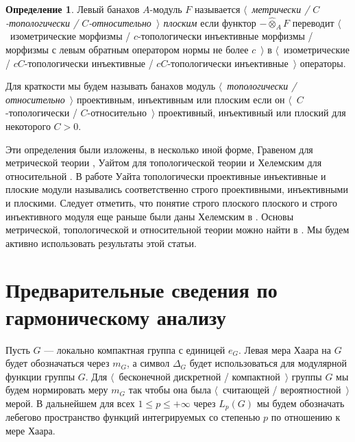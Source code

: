 \documentclass{article}
\numberwithin{equation}{section}
\theoremstyle{plain}
\theoremstyle{definition}
\newtheorem{definition}{Определение}
\newcommand{\projtens}{\mathbin{\widehat{\otimes}}}
\begin{document}
\begin{fulltext}
\begin{definition} Левый банахов $A$-модуль $F$ называется \emph{$\langle$~метрически / 
$C$-топологически / $C$-относительно~$\rangle$ плоским} если функтор $-\projtens_A F$ 
переводит $\langle$~изометрические морфизмы / $c$-топологически инъективные морфизмы / 
морфизмы с левым обратным оператором нормы не более $c$~$\rangle$ в 
$\langle$~изометрические / $cC$-топологически инъективные / $cC$-топологически 
инъективные~$\rangle$ операторы.
\end{definition}

Для краткости мы будем называть банахов модуль \emph{$\langle$~топологически / 
относительно~$\rangle$} проективным, инъективным или плоским если он 
$\langle$~$C$-топологически / $C$-относительно~$\rangle$ проективный, инъективный 
или плоский для некоторого $C>0$.

Эти определения были изложены, в несколько иной форме, Гравеном для метрической 
теории \cite{GravInjProjBanMod},  Уайтом для топологической теории 
\cite{WhiteInjmoduAlg} и Хелемским для относительной \cite{HelemHomolDimNorModBanAlg}. 
В работе Уайта топологически проективные инъективные и плоские модули назывались 
соответственно строго проективными, инъективными и плоскими. Следует отметить, 
что понятие строго плоского плоского и строго инъективного модуля еще раньше 
были даны Хелемским в \cite[параграф~VII.1]{HelBanLocConvAlg}. Основы метрической, 
топологической и относительной теории можно найти в \cite{NemGeomProjInjFlatBanMod}. 
Мы будем активно использовать результаты этой статьи.


\section{Предварительные сведения по гармоническому анализу}
\label{SectionPreliminariesOnHarmonicAnalysis} 

Пусть $G$ --- локально компактная группа с единицей $e_G$. Левая мера Хаара на $G$ 
будет обозначаться через $m_G$, а символ $\Delta_G$ будет использоваться для 
модулярной функции группы $G$. Для $\langle$~бесконечной дискретной / 
компактной~$\rangle$ группы $G$ мы будем нормировать меру $m_G$ так чтобы она 
была $\langle$~считающей / вероятностной~$\rangle$ мерой. В дальнейшем для всех 
$1\leq p\leq+\infty$ через $L_p(G)$ мы будем обозначать лебегово пространство функций 
интегрируемых со степенью $p$ по отношению к мере Хаара.


\end{fulltext}
\end{document}
